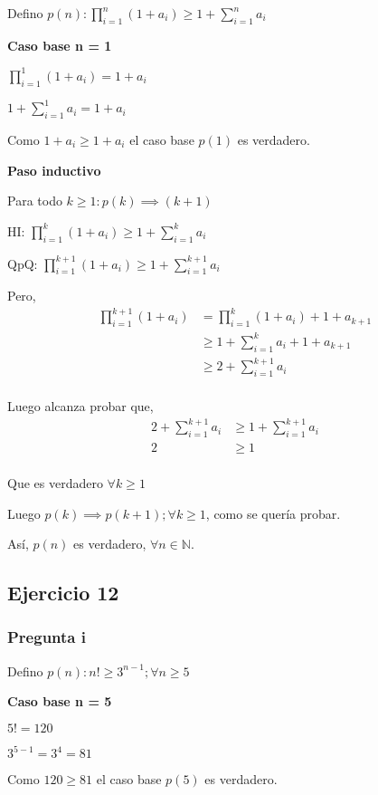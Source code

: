 Defino $ p(n): \prod_{i=1}^{n}(1+a_i)\geq 1+\sum_{i=1}^{n}a_i $

\textbf{Caso base n = 1}

$ \prod_{i=1}^{1}(1+a_i) = 1 + a_i $

$ 1+\sum_{i=1}^{1}a_i = 1+a_i $

Como $ 1 + a_i \geq 1 + a_i $ el caso base $p(1)$ es verdadero.

\textbf{Paso inductivo}

Para todo $k \geq 1: p(k) \implies (k+1)$

HI: $\prod_{i=1}^{k}(1+a_i) \geq 1+\sum_{i=1}^{k}a_i$

QpQ: $ \prod_{i=1}^{k+1}(1+a_i) \geq 1+\sum_{i=1}^{k+1}a_i$

Pero,
\begin{align*}
    \prod_{i=1}^{k+1}(1+a_i) &= \prod_{i=1}^{k}(1+a_i) + 1+a_{k+1} \\
    &\geq 1+\sum_{i=1}^{k}a_i + 1+a_{k+1} \\
    &\geq 2+\sum_{i=1}^{k+1}a_i \\
\end{align*}

Luego alcanza probar que,
\begin{align*}
    2+\sum_{i=1}^{k+1}a_i &\geq 1+\sum_{i=1}^{k+1}a_i \\
    2 &\geq 1 \\
\end{align*}

Que es verdadero $\forall k \geq 1$

Luego $p(k) \implies p(k+1); \forall k \geq 1$, como se quería probar.

Así, $p(n)$ es verdadero, $\forall n \in \mathbb{N}$.

\subsection{Ejercicio 12}

\subsubsection{Pregunta i}

Defino $ p(n): n! \geq 3^{n-1}; \forall n \geq 5 $

\textbf{Caso base n = 5}

$ 5! = 120 $

$ 3^{5-1} = 3^4 = 81$

Como $ 120 \geq 81 $ el caso base $p(5)$ es verdadero.

